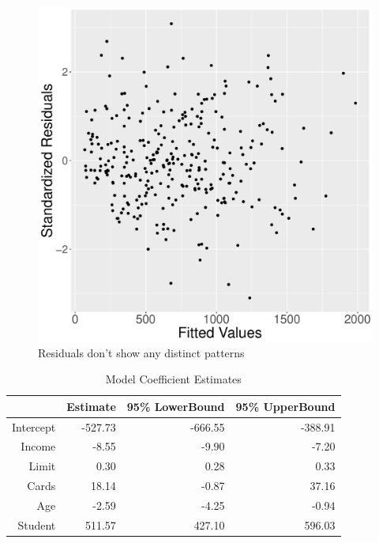 \documentclass{article}
\begin{document}
\begin{figure}
\centering
\includegraphics[scale=.3]{fitted.pdf}
\caption{Residuals don't show any distinct patterns}
\label{fitted}
\end{figure}


\begin{table}[ht]
\centering
\begin{tabular}{rrrr}
  \hline
 & Estimate & 95\% LowerBound & 95\% UpperBound \\ 
  \hline
Intercept & -527.73 & -666.55 & -388.91 \\ 
  Income & -8.55 & -9.90 & -7.20 \\ 
  Limit & 0.30 & 0.28 & 0.33 \\ 
  Cards & 18.14 & -0.87 & 37.16 \\ 
  Age & -2.59 & -4.25 & -0.94 \\ 
  Student & 511.57 & 427.10 & 596.03 \\ 
   \hline
\end{tabular}
\caption{Model Coefficient Estimates} 
\label{coefs}
\end{table}
\end{document}
